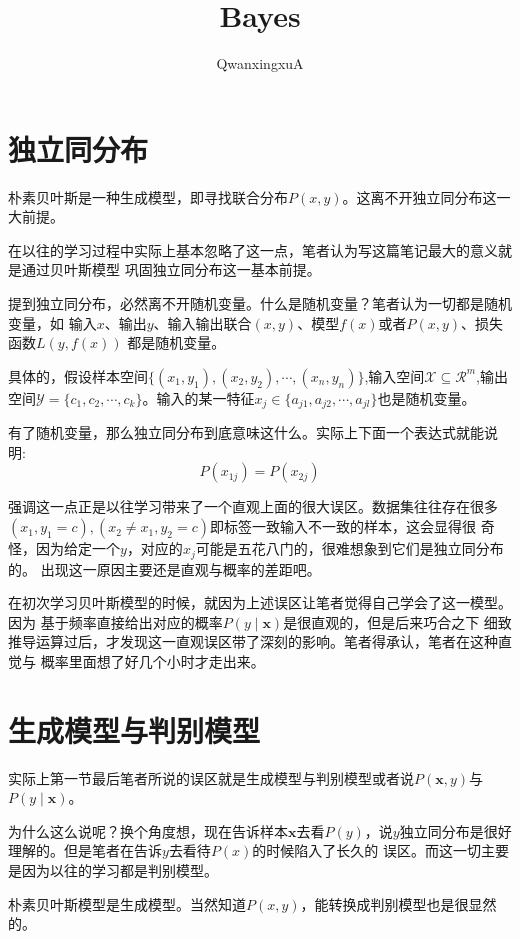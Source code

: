 \documentclass{article}
\title{Bayes}
\author{QwanxingxuA}
\begin{document}
\maketitle
    \section{独立同分布}
    朴素贝叶斯是一种生成模型，即寻找联合分布$P(x,y)$。这离不开独立同分布这一大前提。

    在以往的学习过程中实际上基本忽略了这一点，笔者认为写这篇笔记最大的意义就是通过贝叶斯模型
    巩固独立同分布这一基本前提。

    提到独立同分布，必然离不开随机变量。什么是随机变量？笔者认为一切都是随机变量，如
    输入$x$、输出$y$、输入输出联合$(x,y)$、模型$f(x)$或者$P(x,y)$、损失函数$L(y,f(x))$
    都是随机变量。

    具体的，假设样本空间$\{(x_1,y_1),(x_2,y_2),\cdots,(x_n,y_n)\}$,输入空间$\mathcal{X}\subseteq \mathcal{R}^m$,输出空间$
    \mathcal{Y}=\{c_1,c_2,\cdots,c_k\}$。输入的某一特征$x_j \in \{a_{j1},a_{j2},\cdots,a_{jl}\}$也是随机变量。

    有了随机变量，那么独立同分布到底意味这什么。实际上下面一个表达式就能说明:
    \[P(x_{1j})=P(x_{2j})\]

    强调这一点正是以往学习带来了一个直观上面的很大误区。数据集往往存在很多
    $(x_1,y_1=c),(x_2\neq x_1,y_2=c)$即标签一致输入不一致的样本，这会显得很
    奇怪，因为给定一个$y$，对应的$x_j$可能是五花八门的，很难想象到它们是独立同分布的。
    出现这一原因主要还是直观与概率的差距吧。

    在初次学习贝叶斯模型的时候，就因为上述误区让笔者觉得自己学会了这一模型。因为
    基于频率直接给出对应的概率$P(y\mid \boldsymbol{x})$是很直观的，但是后来巧合之下
    细致推导运算过后，才发现这一直观误区带了深刻的影响。笔者得承认，笔者在这种直觉与
    概率里面想了好几个小时才走出来。

    \section{生成模型与判别模型}
    实际上第一节最后笔者所说的误区就是生成模型与判别模型或者说$P(\boldsymbol{x},y)$与$P(y\mid\boldsymbol{x})$。

    为什么这么说呢？换个角度想，现在告诉样本$\boldsymbol{x}$去看$P(y)$，说$y$独立同分布是很好理解的。但是笔者在告诉$y$去看待$P(x)$的时候陷入了长久的
    误区。而这一切主要是因为以往的学习都是判别模型。

    朴素贝叶斯模型是生成模型。当然知道$P(x,y)$，能转换成判别模型也是很显然的。
\end{document}
